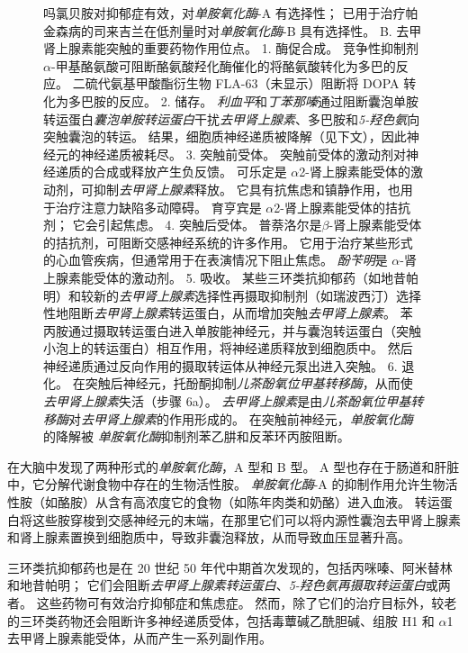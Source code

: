 \begin{figure}[htbp]
{	吗氯贝胺对抑郁症有效，对\textit{单胺氧化酶}-A 有选择性；
	已用于治疗帕金森病的司来吉兰在低剂量时对\textit{单胺氧化酶}-B 具有选择性。 
	B. 去甲肾上腺素能突触的重要药物作用位点。 
	1. 酶促合成。
	竞争性抑制剂 $\alpha$-甲基酪氨酸可阻断酪氨酸羟化酶催化的将酪氨酸转化为多巴的反应。
	二硫代氨基甲酸酯衍生物 FLA-63（未显示）阻断将 DOPA 转化为多巴胺的反应。
	2. 储存。
	\textit{利血平}和\textit{丁苯那嗪}通过阻断囊泡单胺转运蛋白\textit{囊泡单胺转运蛋白}干扰\textit{去甲肾上腺素}、多巴胺和\textit{5-羟色氨}向突触囊泡的转运。
	结果，细胞质神经递质被降解（见下文），因此神经元的神经递质被耗尽。
	3. 突触前受体。
	突触前受体的激动剂对神经递质的合成或释放产生负反馈。
	可乐定是 $\alpha$2-肾上腺素能受体的激动剂，可抑制\textit{去甲肾上腺素}释放。
	它具有抗焦虑和镇静作用，也用于治疗注意力缺陷多动障碍。
	育亨宾是 $\alpha$2-肾上腺素能受体的拮抗剂； 它会引起焦虑。
	4. 突触后受体。
	普萘洛尔是$\beta$-肾上腺素能受体的拮抗剂，可阻断交感神经系统的许多作用。
	它用于治疗某些形式的心血管疾病，但通常用于在表演情况下阻止焦虑。
	\textit{酚苄明}是 $\alpha$-肾上腺素能受体的激动剂。
	5. 吸收。
	某些三环类抗抑郁药（如地昔帕明）和较新的\textit{去甲肾上腺素}选择性再摄取抑制剂（如瑞波西汀）选择性地阻断\textit{去甲肾上腺素}转运蛋白，从而增加突触\textit{去甲肾上腺素}。
	苯丙胺通过摄取转运蛋白进入单胺能神经元，并与囊泡转运蛋白（突触小泡上的转运蛋白）相互作用，将神经递质释放到细胞质中。
	然后神经递质通过反向作用的摄取转运体从神经元泵出进入突触。
	6. 退化。
	在突触后神经元，托酚酮抑制\textit{儿茶酚氧位甲基转移酶}，从而使\textit{去甲肾上腺素}失活（步骤 6a）。
	\textit{去甲肾上腺素}是由\textit{儿茶酚氧位甲基转移酶}对\textit{去甲肾上腺素}的作用形成的。
	在突触前神经元，\textit{单胺氧化酶}的降解被 \textit{单胺氧化酶}抑制剂苯乙肼和反苯环丙胺阻断。}
\end{figure}


在大脑中发现了两种形式的\textit{单胺氧化酶}，A 型和 B 型。
A 型也存在于肠道和肝脏中，它分解代谢食物中存在的生物活性胺。
\textit{单胺氧化酶}-A 的抑制作用允许生物活性胺（如酪胺）从含有高浓度它的食物（如陈年肉类和奶酪）进入血液。
转运蛋白将这些胺穿梭到交感神经元的末端，在那里它们可以将内源性囊泡去甲肾上腺素和肾上腺素置换到细胞质中，导致非囊泡释放，从而导致血压显著升高。


三环类抗抑郁药也是在 20 世纪 50 年代中期首次发现的，包括丙咪嗪、阿米替林和地昔帕明；
它们会阻断\textit{去甲肾上腺素转运蛋白}、\textit{5-羟色氨再摄取转运蛋白}或两者。
这些药物可有效治疗抑郁症和焦虑症。
然而，除了它们的治疗目标外，较老的三环类药物还会阻断许多神经递质受体，包括毒蕈碱乙酰胆碱、组胺 H1 和 $\alpha$1 去甲肾上腺素能受体，从而产生一系列副作用。


